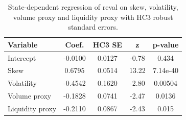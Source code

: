 \begin{table}[t]
\centering
\small
\begin{tabular}{lcccc}
\toprule
Variable & Coef. & HC3 SE & z & p-value \\
\midrule
Intercept & -0.0100 & 0.0127 & -0.78 & 0.434 \\
Skew & 0.6795 & 0.0514 & 13.22 & 7.14e-40 \\
Volatility & -0.4542 & 0.1620 & -2.80 & 0.00504 \\
Volume proxy & -0.1828 & 0.0741 & -2.47 & 0.0136 \\
Liquidity proxy & -0.2110 & 0.0867 & -2.43 & 0.015 \\
\bottomrule
\end{tabular}
\caption{State-dependent regression of reval on skew, volatility, volume proxy and liquidity proxy with HC3 robust standard errors.}
\label{tab:state_regression}
\end{table}
